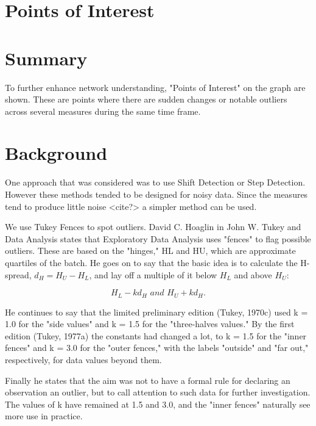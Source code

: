 
\section*{Points of Interest}

\section*{Summary}
To further enhance network understanding, "Points of Interest" on the graph are shown. These are points where there are sudden changes or notable outliers across several measures during the same time frame.

\section{Background}
One approach that was considered was to use Shift Detection or Step Detection\cite{sd}. However these methods tended to be designed for noisy data. Since the measures tend to produce little noise <cite?> a simpler method can be used.

We use Tukey Fences to spot outliers. David C. Hoaglin in John W. Tukey and Data Analysis \cite{jwtada} states that Exploratory Data Analysis\cite{eda} uses "fences" to flag possible outliers. These are based on the "hinges," HL and HU, which are approximate quartiles of the batch. He goes on to say that the basic idea is to calculate the H-spread, $d_H = H_U - H_L$, and lay off a multiple of it below $H_L$ and above $H_U$: 

\begin{equation}
 H_L-kd_H \, \, and \, \, H_U + kd_H.
\end{equation}


He continues to say that the limited preliminary edition (Tukey, 1970c) used k = 1.0 for the "side values" and k = 1.5 for the "three-halves values." By the first edition (Tukey, 1977a) the constants had changed a lot, to k = 1.5 for the "inner fences" and k = 3.0 for the "outer fences," with the labels "outside" and "far out," respectively, for data values beyond them.

Finally he states that the aim was not to have a formal rule for declaring an observation an outlier, but to call attention to such data for further investigation. The values of k have remained at 1.5 and 3.0, and the "inner fences" naturally see more use in practice. 



